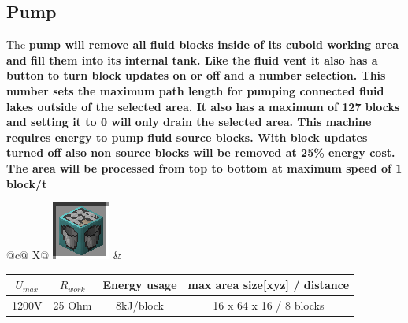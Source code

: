 \documentclass[11pt]{article} %
\makeatletter
\newcommand{\imgtex}{\begin{tabularx}{\textwidth}{@{}c@{ }X@{}}}
\makeatother
\begin{document}
\subsection{Pump}
The \bf pump \rm will remove all fluid blocks inside of its cuboid working area and fill them into its internal tank. Like the fluid vent it also has a button to turn block updates on or off and a number selection. This number sets the maximum path length for pumping connected fluid lakes outside of the selected area. It also has a maximum of 127 blocks and setting it to 0 will only drain the selected area. This machine requires energy to pump fluid source blocks. With block updates turned off also non source blocks will be removed at 25\% energy cost. The area will be processed from top to bottom at maximum speed of 1 block/t\\
\imgtex
\includegraphics[align = m]{blockPump} &
\begin{tabular}{| c | c | c | c |} \hline
\bf $U_{max}$ & \bf $R_{work}$ & \bf Energy usage & \bf max area size[xyz] / distance \\ \hline
1200V & 25 Ohm & 8kJ/block & 16 x 64 x 16 / 8 blocks \\ \hline
\end{tabular} \\
\end{tabularx}
\end{document}
